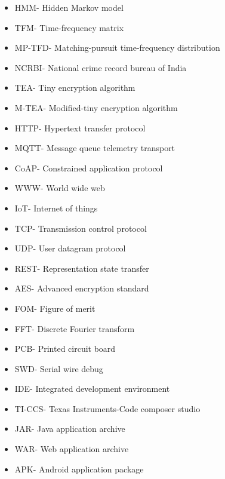\begin{itemize}
\item HMM- Hidden Markov model
\item TFM- Time-frequency matrix
\item MP-TFD- Matching-pursuit time-frequency distribution
\item NCRBI- National crime record bureau of India
\item TEA- Tiny encryption algorithm
\item M-TEA- Modified-tiny encryption algorithm
\item HTTP- Hypertext transfer protocol
\item MQTT- Message queue telemetry transport
\item CoAP- Constrained application protocol
\item WWW- World wide web
\item IoT- Internet of things
\item TCP- Transmission control protocol
\item UDP- User datagram protocol
\item REST- Representation state transfer
\item AES- Advanced encryption standard
\item FOM- Figure of merit
\item FFT- Discrete Fourier transform
\item PCB- Printed circuit board
\item SWD- Serial wire debug
\item IDE- Integrated development environment
\item TI-CCS- Texas Instruments-Code composer studio
\item JAR- Java application archive
\item WAR- Web application archive 
\item APK- Android application package
\end{itemize}


